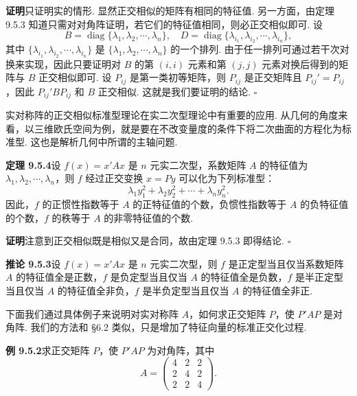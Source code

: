 \documentclass[UTF8, 12pt, fontset=fandol, oneside]{ctexart}
\begin{document}
\noindent\textbf{证明}\quad 只证明实的情形. 显然正交相似的矩阵有相同的特征值. 另一方面，由定理 9.5.3 知道只需对对角阵证明，若它们的特征值相同，则必正交相似即可. 设
\[
  B=\operatorname{diag}\{\lambda_1,\lambda_2,\cdots,\lambda_n\},\quad
  D=\operatorname{diag}\{\lambda_{i_1},\lambda_{i_2},\cdots,\lambda_{i_n}\},
\]
其中 $\{\lambda_{i_1},\lambda_{i_2},\cdots,\lambda_{i_n}\}$ 是 $\{\lambda_1,\lambda_2,\cdots,\lambda_n\}$ 的一个排列. 由于任一排列可通过若干次对换来实现，因此只要证明对 $B$ 的第 $(i,i)$ 元素和第 $(j,j)$ 元素对换后得到的矩阵与 $B$ 正交相似即可. 设 $P_{ij}$ 是第一类初等矩阵，则 $P_{ij}$ 是正交矩阵且 $P_{ij}'=P_{ij}$，因此 $P_{ij}'BP_{ij}$ 和 $B$ 正交相似. 这就是我们要证明的结论. $\square$

实对称阵的正交相似标准型理论在实二次型理论中有重要的应用. 从几何的角度来看，以三维欧氏空间为例，就是要在不改变量度的条件下将二次曲面的方程化为标准型. 这也是解析几何中所谓的主轴问题.

\noindent\textbf{定理 9.5.4}\quad 设 $f(x)=x'Ax$ 是 $n$ 元实二次型，系数矩阵 $A$ 的特征值为 $\lambda_1,\lambda_2,\cdots,\lambda_n$，则 $f$ 经过正交变换 $x=Py$ 可以化为下列标准型：
\[
  \lambda_1y_1^2+\lambda_2y_2^2+\cdots+\lambda_ny_n^2.
\]
因此，$f$ 的正惯性指数等于 $A$ 的正特征值的个数，负惯性指数等于 $A$ 的负特征值的个数，$f$ 的秩等于 $A$ 的非零特征值的个数.

\noindent\textbf{证明}\quad 注意到正交相似既是相似又是合同，故由定理 9.5.3 即得结论. $\square$

\noindent\textbf{推论 9.5.3}\quad 设 $f(x)=x'Ax$ 是 $n$ 元实二次型，则 $f$ 是正定型当且仅当系数矩阵 $A$ 的特征值全是正数，$f$ 是负定型当且仅当 $A$ 的特征值全是负数，$f$ 是半正定型当且仅当 $A$ 的特征值全非负，$f$ 是半负定型当且仅当 $A$ 的特征值全非正.

下面我们通过具体例子来说明对实对称阵 $A$，如何求正交矩阵 $P$，使 $P'AP$ 是对角阵. 我们的方法和 §6.2 类似，只是增加了特征向量的标准正交化过程.

\noindent\textbf{例 9.5.2}\quad 求正交矩阵 $P$，使 $P'AP$ 为对角阵，其中
\[
  A=
  \left(\begin{array}{ccc}
    4 & 2 & 2\\
    2 & 4 & 2\\
    2 & 2 & 4
  \end{array}\right).
\]
\end{document}
